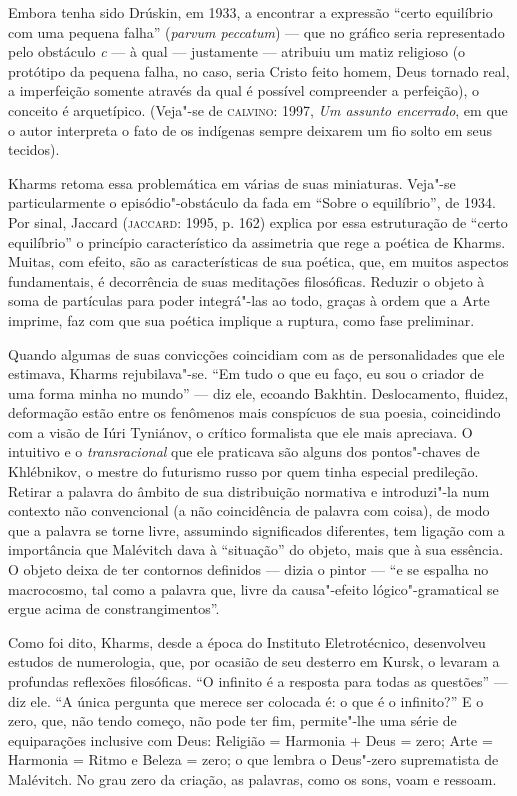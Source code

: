 Embora tenha sido Drúskin, em 1933, a encontrar a expressão ``certo
equilíbrio com uma pequena falha'' (\emph{parvum peccatum}) --- que no
gráfico seria representado pelo obstáculo \emph{c} --- à qual ---
justamente --- atribuiu um matiz religioso (o protótipo da pequena falha,
no caso, seria Cristo feito homem, Deus tornado real, a imperfeição
somente através da qual é possível compreender a perfeição), o conceito
é arquetípico. (Veja"-se de \textsc{calvino}: 1997, \emph{Um assunto
encerrado}, em que o autor interpreta o fato de os indígenas sempre
deixarem um fio solto em seus tecidos).

Kharms retoma essa problemática em várias de suas miniaturas. Veja"-se
particularmente o episódio"-obstáculo da fada em ``Sobre o equilíbrio'',
de 1934. Por sinal, Jaccard (\textsc{jaccard}: 1995, p. 162) explica por
essa estruturação de ``certo equilíbrio'' o princípio característico da
assimetria que rege a poética de Kharms. Muitas, com efeito, são as
características de sua poética, que, em muitos aspectos fundamentais, é
decorrência de suas meditações filosóficas. Reduzir o objeto à soma de
partículas para poder integrá"-las ao todo, graças à ordem que a Arte
imprime, faz com que sua poética implique a ruptura, como fase
preliminar.

Quando algumas de suas convicções coincidiam com as de personalidades
que ele estimava, Kharms rejubilava"-se. ``Em tudo o que eu faço, eu sou
o criador de uma forma minha no mundo'' --- diz ele, ecoando Bakhtin.
Deslocamento, fluidez, deformação estão entre os fenômenos mais
conspícuos de sua poesia, coincidindo com a visão de Iúri Tyniánov, o
crítico formalista que ele mais apreciava. O intuitivo e o
\emph{transracional} que ele praticava são alguns dos pontos"-chaves de
Khlébnikov, o mestre do futurismo russo por quem tinha especial
predileção. Retirar a palavra do âmbito de sua distribuição normativa e
introduzi"-la num contexto não convencional (a não coincidência de
palavra com coisa), de modo que a palavra se torne livre, assumindo
significados diferentes, tem ligação com a importância que Malévitch
dava à ``situação'' do objeto, mais que à sua essência. O objeto deixa
de ter contornos definidos --- dizia o pintor --- ``e se espalha no
macrocosmo, tal como a palavra que, livre da causa"-efeito
lógico"-gramatical se ergue acima de constrangimentos''.

Como foi dito, Kharms, desde a época do Instituto Eletrotécnico,
desenvolveu estudos de numerologia, que, por ocasião de seu desterro em
Kursk, o levaram a profundas reflexões filosóficas. ``O infinito é a
resposta para todas as questões'' --- diz ele. ``A única pergunta que
merece ser colocada é: o que é o infinito?'' E o zero, que, não tendo
começo, não pode ter fim, permite"-lhe uma série de equiparações
inclusive com Deus: Religião = Harmonia + Deus = zero; Arte = Harmonia =
Ritmo e Beleza = zero; o que lembra o Deus"-zero suprematista de
Malévitch. No grau zero da criação, as palavras, como os sons, voam e
ressoam.

